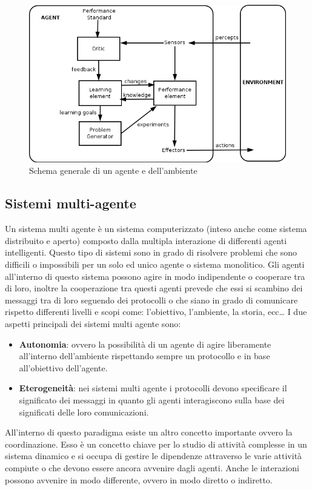 \begin{figure}[H]
    \centering
    \includegraphics[width=.7\textwidth]{resources/schema_agente.png}
    \caption{Schema generale di un agente e dell'ambiente} 
\end{figure}

\subsection{Sistemi multi-agente}
Un sistema multi agente è un sistema computerizzato (inteso anche come sistema distribuito e aperto) composto dalla multipla interazione di differenti agenti intelligenti. Questo tipo di sistemi sono in grado di risolvere problemi che sono difficili o impossibili per un solo ed unico agente o sistema monolitico.
Gli agenti all'interno di questo sistema possono agire in modo indipendente o cooperare tra di loro, inoltre la cooperazione tra questi agenti prevede che essi si scambino dei messaggi tra di loro seguendo dei protocolli o che siano in grado di comunicare rispetto differenti livelli e scopi come: l'obiettivo, l'ambiente, la storia, ecc…
I due aspetti principali dei sistemi multi agente sono:
\begin{itemize}
    \item \textbf{Autonomia}: ovvero la possibilità di un agente di agire liberamente all'interno dell'ambiente rispettando sempre un protocollo e in base all'obiettivo dell'agente.
    \item \textbf{Eterogeneità}: nei sistemi multi agente i protocolli devono specificare il significato dei messaggi in quanto gli agenti interagiscono sulla base dei significati delle loro comunicazioni.
\end{itemize}

All'interno di questo paradigma esiste un altro concetto importante ovvero la coordinazione. Esso è un concetto chiave per lo studio di attività complesse in un sistema dinamico e si occupa di gestire le dipendenze attraverso le varie attività compiute o che devono essere ancora avvenire dagli agenti.
Anche le interazioni possono avvenire in modo differente, ovvero in modo diretto o indiretto.

